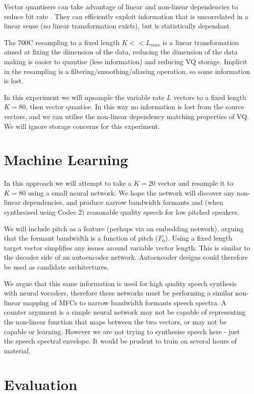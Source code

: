 \documentclass{article}
\begin{document}
Vector quantisers can take advantage of linear and non-linear dependencies to reduce bit rate \cite{makhoul1985vector}.  They can efficiently exploit information that is uncorrelated in a linear sense (no linear transformation exists), but is statistically dependant.

The 700C resampling to a fixed length $K<<L_{max}$ is a linear transformation aimed at fixing the dimension of the data, reducing the dimension of the data making is easier to quantise (less information) and reducing VQ storage.  Implicit in the resampling is a filtering/smoothing/aliasing operation, so some information is lost.

In this experiment we will upsample the variable rate $L$ vectors to a fixed length $K=80$, then vector quantise.  In this way no information is lost from the source vectors, and we can utilise the non-linear dependency matching properties of VQ.  We will ignore storage concerns for this experiment.

\section{Machine Learning}

In this approach we will attempt to take a $K=20$ vector and resample it to $K=80$ using a small neural network.   We hope the network will discover any non-linear dependencies, and produce narrow bandwidth formants and (when synthesised using Codec 2) reasonable quality speech for low pitched speakers.  

We will include pitch as a feature (perhaps via an embedding network), arguing that the formant bandwidth is a function of pitch ($F_0$).  Using a fixed length target vector simplifies any issues around variable vector length.  This is similar to the decoder side of an autoencoder network.  Autoencoder designs could therefore be used as candidate architectures.

We argue that this same information is used for high quality speech synthesis with neural vocoders, therefore these networks must be performing a similar non-linear mapping of MFCs to narrow bandwidth formants speech spectra.   A counter argument is a simple neural network may not be capable of representing the non-linear function that maps between the two vectors, or may not be capable or learning.  However we are not trying to synthesise speech here - just the speech spectral envelope.  It would be prudent to train on several hours of material.

\section{Evaluation}
\end{document}
